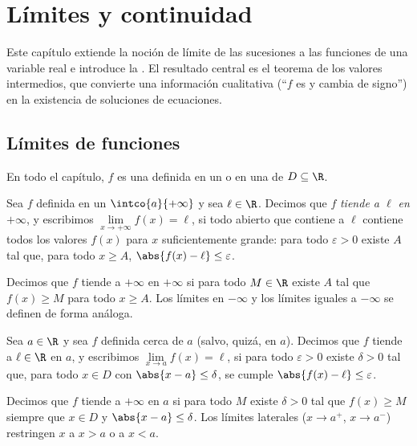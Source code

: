 \chapter{Límites y continuidad}\label{ch:g12:limcont}

Este capítulo extiende la noción de límite de las sucesiones a las funciones
de una variable real e introduce la . El resultado central es el
teorema de los valores intermedios, que convierte una información
cualitativa (``$f$ es  y cambia de signo'') en la existencia de
soluciones de ecuaciones.

\section{Límites de funciones}

En todo el capítulo, $f$ es una  definida en un  o en una
 de  $D \subseteq \R$.

\begin{definition}\label{def:g12:limcont:liminf}
Sea $f$ definida en un  $\intco{a}{+\infty}$ y sea $\ell \in \R$.
Decimos que $f$ \emph{tiende a $\ell$ en
$+\infty$}, y escribimos
$\lim\limits_{x\to+\infty} f(x) = \ell$, si todo  abierto que
contiene a $\ell$ contiene todos los valores $f(x)$ para $x$
suficientemente grande: para todo $\varepsilon > 0$ existe $A$ tal que,
para todo $x \geq A$, $\abs{f(x) - \ell} \leq \varepsilon$.

Decimos que $f$ tiende a $+\infty$ en $+\infty$ si para todo $M \in \R$
existe $A$ tal que $f(x) \geq M$ para todo $x \geq A$. Los límites en
$-\infty$ y los límites iguales a $-\infty$ se definen de forma análoga.
\end{definition}

\begin{definition}\label{def:g12:limcont:limpoint}
Sea $a \in \R$ y sea $f$ definida cerca de $a$ (salvo, quizá, en $a$).
Decimos que $f$ tiende a $\ell \in \R$ en $a$, y escribimos
$\lim\limits_{x \to a} f(x) = \ell$, si para todo $\varepsilon > 0$ existe
$\delta > 0$ tal que, para todo $x \in D$ con $\abs{x - a} \leq \delta$, se
cumple $\abs{f(x) - \ell} \leq \varepsilon$.

Decimos que $f$ tiende a $+\infty$ en $a$ si para todo $M$ existe
$\delta > 0$ tal que $f(x) \geq M$ siempre que $x \in D$ y
$\abs{x - a} \leq \delta$. Los límites laterales ($x \to a^+$,
$x \to a^-$) restringen $x$ a $x > a$ o a $x < a$.
\end{definition}

